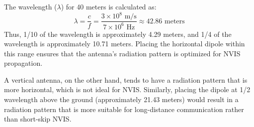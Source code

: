 The wavelength (\(\lambda\)) for 40 meters is calculated as:
\[
\lambda = \frac{c}{f} = \frac{3 \times 10^8 \text{ m/s}}{7 \times 10^6 \text{ Hz}} \approx 42.86 \text{ meters}
\]
Thus, 1/10 of the wavelength is approximately 4.29 meters, and 1/4 of the wavelength is approximately 10.71 meters. Placing the horizontal dipole within this range ensures that the antenna's radiation pattern is optimized for NVIS propagation.

A vertical antenna, on the other hand, tends to have a radiation pattern that is more horizontal, which is not ideal for NVIS. Similarly, placing the dipole at 1/2 wavelength above the ground (approximately 21.43 meters) would result in a radiation pattern that is more suitable for long-distance communication rather than short-skip NVIS.

